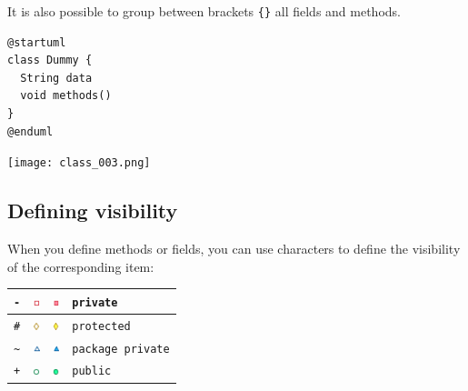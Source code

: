 \begin{description}
\item It is also possible to group between brackets \texttt{\{\}}
all fields and methods.
\end{description}

\begin{lstlisting}
@startuml
class Dummy {
  String data
  void methods()
}
@enduml
\end{lstlisting}
\begin{center}
\texttt{[image: class\_003.png]}
\end{center}


\newpage \subsection{Defining visibility}

\begin{description}
\item When you define methods or fields, you can use characters to define the
visibility of the corresponding item:
\end{description}

\begin{tabular}{|c|c|c|l|} \hline
\texttt{-} & 
\includegraphics[width=2mm]{img/PRIVATE_FIELD.png} &
\includegraphics[width=2mm]{img/PRIVATE_METHOD.png} &
\texttt{private}
\\ \hline

\texttt{\#} & 
\includegraphics[width=2mm]{img/PROTECTED_FIELD.png} &
\includegraphics[width=2mm]{img/PROTECTED_METHOD.png} &
\texttt{protected}
\\ \hline

\texttt{\~} & 
\includegraphics[width=2mm]{img/PACKAGE_PRIVATE_FIELD.png} &
\includegraphics[width=2mm]{img/PACKAGE_PRIVATE_METHOD.png} &
\texttt{package private}
\\ \hline

\texttt{+} & 
\includegraphics[width=2mm]{img/PUBLIC_FIELD.png} &
\includegraphics[width=2mm]{img/PUBLIC_METHOD.png} &
\texttt{public}
\\ \hline
\end{tabular}

